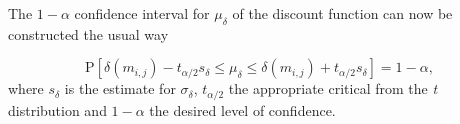 The $1- \alpha$ confidence interval for $\mu_{\delta}$ of the discount function can now be constructed the usual way

\begin{equation}
\label{eq:cint}
\mbox{P}\left[ \delta(m_{i,j}) - t_{\alpha / 2} s_{\delta}   \leq \mu_{\delta}  \leq \delta(m_{i,j})  + t_{\alpha / 2} s_{\delta}\right]= 1 - \alpha,
\end{equation} 
where $s_{\delta}$ is the estimate for $\sigma_{\delta}$, $t_{\alpha / 2}$ the appropriate critical from the \textit{t} distribution and $1-\alpha$ the desired level of confidence. 

















